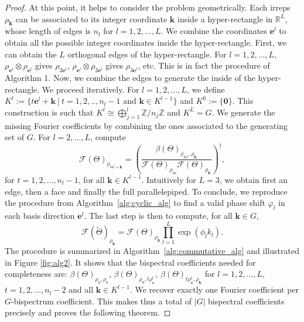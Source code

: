 \documentclass{article}
\theoremstyle{plain}
\theoremstyle{definition}
\theoremstyle{remark}
\newcommand{\kbf}{\mathbf{k}}
\newcommand{\ebf}{\mathbf{e}}
\begin{document}
\begin{proof}
At this point, it helps to consider the problem geometrically. Each irreps $\rho_\kbf$ can be associated to its integer coordinate $\kbf$ inside a hyper-rectangle in $\mathbb{R}^L$, whose length of edges is $n_l$ for $l=1,2,...,L$. We combine the coordinates $\ebf^l$ to obtain all the possible integer coordinates inside the hyper-rectangle. First, we can obtain the $L$ orthogonal edges of the hyper-rectangle. For $l=1,2,...,L$, $\rho_{\ebf^l}\otimes \rho_{\ebf^l}$ gives $\rho_{2\ebf^l}$, $\rho_{\ebf^l}\otimes \rho_{2\ebf^l}$ gives $\rho_{3\ebf^l}$, etc. This is in fact the procedure of Algorithm 1. Now, we combine the edges to generate the inside of the hyper-rectangle. We proceed iteratively. For $l=1,2,...,L$, we define $K^l:=\{t\ebf^l + \kbf \ | \ t=1,2,..,n_l-1\text{ and } \kbf\in K^{l-1}\}$ and $K^0:=\{\mathbf{0}\}$. This construction is such that $K^l\cong\bigoplus_{j=1}^l \mathbb{Z}/n_j\mathbb{Z}$ and $K^L=G$. We generate the missing Fourier coefficients by combining the ones associated to the generating set of $G$.
For $l=2,...,L$, compute
\begin{equation}
    \mathcal{F}(\Theta)_{\rho_{t\ebf^l+\kbf}}=\left(\frac{\beta(\Theta)_{\rho_{t\ebf^l},\rho_{\kbf}}}{\mathcal{F}(\Theta)_{\rho_{t\ebf}}\mathcal{F}(\Theta)_{\rho_{\kbf}}}\right)^\dagger,
\end{equation}
for $t=1,2,...,n_l-1$, for all $\kbf\in K^{l-1}$. Intuitively for $L=3$, we obtain first an edge, then a face and finally the full parallelepiped. To conclude, we reproduce the procedure from Algorithm~\ref{alg:cyclic_alg} to find a valid phase shift $\varphi_l$ in each basis direction $\ebf^l$. The last step is then to compute, for all $\kbf\in G$, $$\mathcal{F}(\widetilde{\Theta})_{\rho_{\kbf}} =\mathcal{F}(\Theta)_{\rho_{\kbf}} \prod_{l=1}^L\exp(\phi_l k_l).$$  The procedure is summarized in Algorithm~\ref{alg:commutative_alg} and illustrated in Figure \ref{fig:alg2}. It shows that the bispectral coefficients needed for completeness are: $\beta(\Theta)_{\rho_0,\rho_0}$, $\beta(\Theta)_{\rho_0,t\rho_{\ebf}^l},\ \beta(\Theta)_{t\rho_{\ebf}^l, \rho_\kbf} $ for $l=1,2,...,L$, $t=1,2,...,n_l-2$ and all $\kbf\in K^{l-1}$. We recover exactly one Fourier coefficient per $G$-bispectrum coefficient. This makes thus a total of $|G|$ bispectral coefficients precisely and proves the following theorem.
\end{proof}
\end{document}
